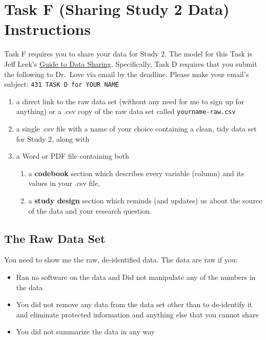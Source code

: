 \documentclass[]{book}
\providecommand{\tightlist}{%
  \setlength{\itemsep}{0pt}\setlength{\parskip}{0pt}}
\theoremstyle{definition}
\theoremstyle{definition}
\theoremstyle{definition}
\theoremstyle{remark}
\begin{document}
\hypertarget{task-f-sharing-study-2-data-instructions}{%
\chapter{Task F (Sharing Study 2 Data)
Instructions}\label{task-f-sharing-study-2-data-instructions}}

Task F requires you to share your data for Study 2. The model for this
Task is Jeff Leek's \href{https://github.com/jtleek/datasharing}{Guide
to Data Sharing}. Specifically, Task D requires that you submit the
following to Dr.~Love via email by the deadline. Please make your
email's subject: \texttt{431\ TASK\ D\ for\ YOUR\ NAME}

\begin{enumerate}
\def\labelenumi{\arabic{enumi}.}
\tightlist
\item
  a direct link to the raw data set (without any need for me to sign up
  for anything) or a .csv copy of the raw data set called
  \texttt{yourname-raw.csv}
\item
  a single .csv file with a name of your choice containing a clean, tidy
  data set for Study 2, along with
\item
  a Word or PDF file containing both

  \begin{enumerate}
  \def\labelenumii{\alph{enumii}.}
  \tightlist
  \item
    a \textbf{codebook} section which describes every variable (column)
    and its values in your .csv file,
  \item
    a \textbf{study design} section which reminds (and updates) us about
    the source of the data and your research question.
  \end{enumerate}
\end{enumerate}

\hypertarget{the-raw-data-set}{%
\section{The Raw Data Set}\label{the-raw-data-set}}

You need to show me the raw, de-identified data. The data are raw if
you:

\begin{itemize}
\tightlist
\item
  Ran no software on the data and Did not manipulate any of the numbers
  in the data
\item
  You did not remove any data from the data set other than to
  de-identify it and eliminate protected information and anything else
  that you cannot share
\item
  You did not summarize the data in any way
\end{itemize}
\end{document}

